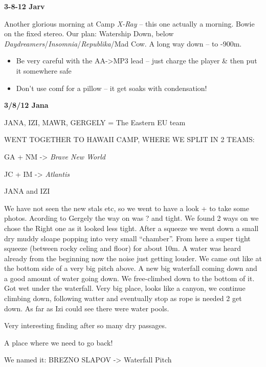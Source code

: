 \textbf{3-8-12 Jarv}

Another glorious morning at Camp \emph{X-Ray} -- this one actually a
morning. Bowie on the fixed stereo. Our plan: Watership Down, below
\emph{Daydreamers}/\emph{Insomnia}/\emph{Republika}/Mad Cow. A long way
down -- to -900m.

\begin{itemize}
\tightlist
\item
  Be very careful with the AA-\textgreater{}MP3 lead -- just charge the
  player \& then put it somewhere safe
\item
  Don't use comf for a pillow -- it get soaks with condensation!
\end{itemize}

\textbf{3/8/12 Jana}

JANA, IZI, MAWR, GERGELY = The Eastern EU team

WENT TOGETHER TO HAWAII CAMP, WHERE WE SPLIT IN 2 TEAMS:

GA + NM -\textgreater{} \emph{Brave New World}

JC + IM -\textgreater{} \emph{Atlantis}

JANA and IZI

We have not seen the new stals etc, so we went to have a look + to take
some photos. Acording to Gergely the way on was ? and tight. We found 2
ways on we chose the Right one as it looked less tight. After a squeeze
we went down a small dry muddy sloape popping into very small
``chamber''. From here a super tight squeeze (between rocky celing and
floor) for about 10m. A water was heard already from the beginning now
the noise just getting louder. We came out like at the bottom side of a
very big pitch above. A new big waterfall coming down and a good amount
of water going down. We free-climbed down to the bottom of it. Got wet
under the waterfall. Very big place, looks like a canyon, we continue
climbing down, following watter and eventually stop as rope is needed 2
get down. As far as Izi could see there were water pools.

Very interesting finding after so many dry passages.

A place where we need to go back!

We named it: BREZNO SLAPOV -\textgreater{} Waterfall Pitch

